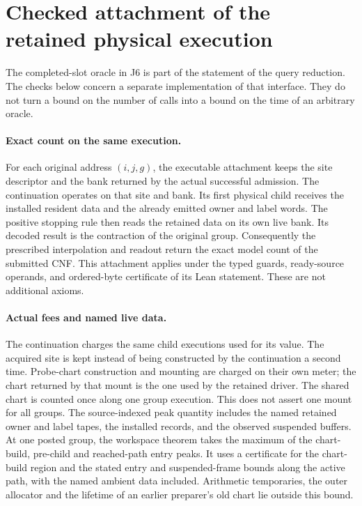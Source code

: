 \documentclass[11pt,a4paper]{article}
\begin{document}
\clearpage
\section{Checked attachment of the retained physical execution}
\label{sec:retained-physical-execution}

The completed-slot oracle in J6 is part of the statement of the query
reduction. The checks below concern a separate implementation of that
interface. They do not turn a bound on the number of calls into a
bound on the time of an arbitrary oracle.

\paragraph*{Exact count on the same execution.}
For each original address \((i,j,g)\), the executable attachment keeps the
site descriptor and the bank returned by the actual successful admission.
The continuation operates on that site and bank. Its first physical
child receives the installed resident data and the already emitted owner
and label words. The positive stopping rule then reads the retained
data on its own live bank. Its decoded result is the contraction of
the original group. Consequently the prescribed interpolation and
readout return the exact model count of the submitted CNF. This
attachment applies under the typed guards, ready-source operands, and
ordered-byte certificate of its Lean statement. These are not additional
axioms.

\paragraph*{Actual fees and named live data.}
The continuation charges the same child executions used for its value.
The acquired site is kept instead of being constructed by the
continuation a second time. Probe-chart construction and mounting are
charged on their own meter; the chart returned by that mount is the
one used by the retained driver. The shared chart is counted once along
one group execution. This does not assert one mount for all groups.
The source-indexed peak quantity includes the named retained owner
and label tapes, the installed records, and the observed suspended
buffers. At one posted group, the workspace theorem takes the maximum
of the chart-build, pre-child and reached-path entry peaks. It uses a
certificate for the chart-build region and the stated entry and
suspended-frame bounds along the active path, with the named ambient
data included. Arithmetic temporaries, the outer allocator and the
lifetime of an earlier preparer's old chart lie outside this bound.
\end{document}
